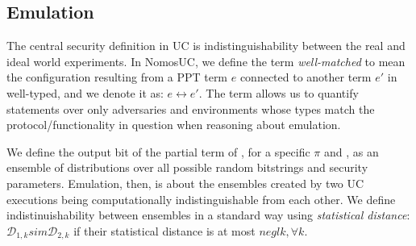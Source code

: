%
%

\subsection{Emulation}
The central security definition in UC is indistinguishability between the real and ideal world experiments.
In NomosUC, we define the term \textit{well-matched} to mean the configuration resulting from a PPT term $e$ connected to another term $e'$ in well-typed, and we denote it as: $e \leftrightarrow e'$.
The term allows us to quantify statements over only adversaries and environments whose types match the protocol/functionality in question when reasoning about emulation. 

We define the output bit of the partial term of , for a specific $\pi$ and \F, as an ensemble of distributions over all possible random bitstrings and security parameters.
Emulation, then, is about the ensembles created by two UC executions being computationally indistinguishable from each other.
We define indistinuishability between ensembles in a standard way using \textit{statistical distance}: $\mathcal{D}_{1,k} sim \mathcal{D}_{2,k}$ if their statistical distance is at most $negl{k}, \forall k$.


